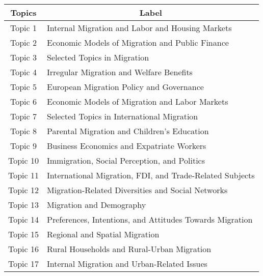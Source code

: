 \begin{landscape}

\end{landscape}

\begin{landscape}

\end{landscape}

\begin{table}[]
\centering
\begin{tabular}{@{}cl@{}}
\toprule
\textbf{Topics} & \multicolumn{1}{c}{\textbf{Label}}                                          \\ \midrule
Topic 1         & Internal Migration and Labor and Housing Markets         \\
Topic 2         & Economic Models of Migration and Public Finance          \\
Topic 3         & Selected Topics in Migration                             \\
Topic 4         & Irregular Migration and Welfare Benefits                 \\
Topic 5         & European Migration Policy and Governance                 \\
Topic 6         & Economic Models of Migration and Labor Markets           \\
Topic 7         & Selected Topics in International Migration               \\
Topic 8         & Parental Migration and Children's Education              \\
Topic 9         & Business Economics and Expatriate Workers                \\
Topic 10        & Immigration, Social Perception, and Politics             \\
Topic 11        & International Migration, FDI, and Trade-Related Subjects \\
Topic 12        & Migration-Related Diversities and Social Networks        \\
Topic 13        & Migration and Demography                                 \\
Topic 14        & Preferences, Intentions, and Attitudes Towards Migration \\
Topic 15        & Regional and Spatial Migration                           \\
Topic 16        & Rural Households and Rural-Urban Migration               \\
Topic 17        & Internal Migration and Urban-Related Issues              \\

\end{tabular}
\end{table}
